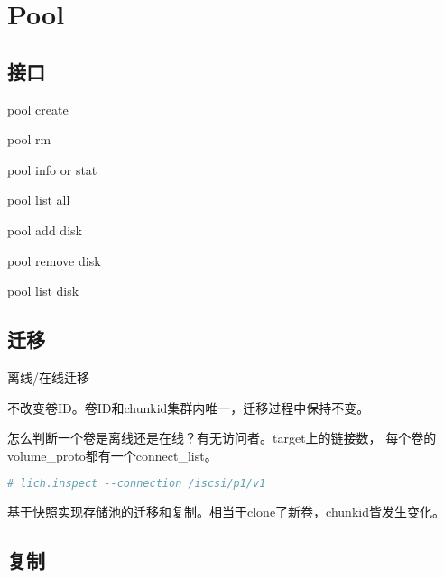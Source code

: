 \chapter{Pool}

\section{接口}

\begin{enumbox}
\item pool create
\item pool rm
\item pool info or stat
\item pool list all
\item pool add disk
\item pool remove disk
\item pool list disk
\end{enumbox}

\section{迁移}

离线/在线迁移

不改变卷ID。卷ID和chunkid集群内唯一，迁移过程中保持不变。

怎么判断一个卷是离线还是在线？有无访问者。target上的链接数，
每个卷的volume\_proto都有一个connect\_list。

\begin{lstlisting}[language=bash,frame=single]
# lich.inspect --connection /iscsi/p1/v1
\end{lstlisting}

基于快照实现存储池的迁移和复制。相当于clone了新卷，chunkid皆发生变化。


\section{复制}
